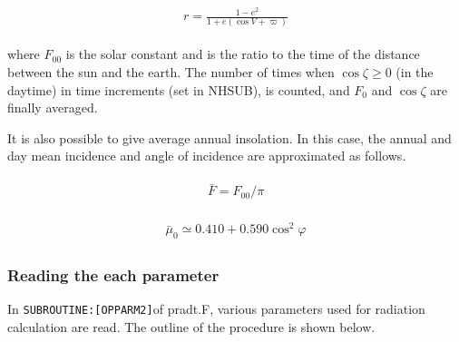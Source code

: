 \begin{eqnarray}
\begin{array}{c}
r=\frac{1-e^{2}}{1+e(\cos V+\varpi)}
\end{array}
\end{eqnarray}

where \(F_{00}\) is the solar constant and is the ratio to the time of
the distance between the sun and the earth. The number of times when
\(\cos \zeta \geq 0\) (in the daytime) in time increments (set in
NHSUB), is counted, and \(F_{0}\) and \(\cos \zeta\) are finally
averaged.

It is also possible to give average annual insolation. In this case, the
annual and day mean incidence and angle of incidence are approximated as
follows.

\begin{eqnarray}
\begin{array}{c}
\bar{F}=F_{00} / \pi
\end{array}
\end{eqnarray}

\begin{eqnarray}
\begin{array}{c}
\bar{\mu}_{0} \simeq 0.410+0.590 \cos ^{2} \varphi
\end{array}
\end{eqnarray}

\hypertarget{reading-the-each-parameter}{%
\subsubsection{Reading the each
parameter}\label{reading-the-each-parameter}}

In \texttt{SUBROUTINE:{[}OPPARM2{]}}of pradt.F, various parameters used
for radiation calculation are read. The outline of the procedure is
shown below.

